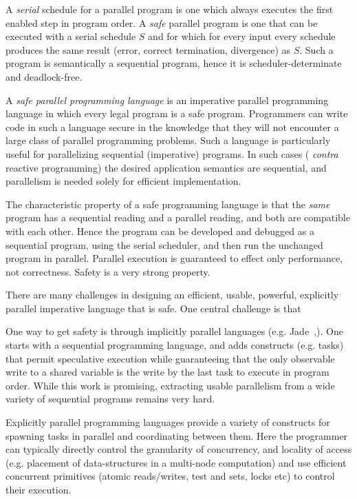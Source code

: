 A {\em serial} schedule for a parallel program is one which always
executes the first enabled step in program order. A {\em safe}
parallel program is one that can be executed with a serial schedule
$S$ and for which for every input every schedule produces the same
result (error, correct termination, divergence) as $S$.  Such a
program is semantically a sequential program, hence it is
scheduler-determinate and deadlock-free.

A {\em safe parallel programming language} is an imperative parallel
programming language in which every legal program is a safe
program. Programmers can write code in such a language secure in the
knowledge that they will not encounter a large class of parallel
programming problems. Such a language is particularly useful for
parallelizing sequential (imperative) programs. In such cases ({\em
  contra} reactive programming) the desired application semantics are
sequential, and parallelism is needed solely for efficient
implementation.

The characteristic property of a safe programming language is that the
{\em same} program has a sequential reading and a parallel reading,
and both are compatible with each other. Hence the program can be
developed and debugged as a sequential program, using the serial
scheduler, and then run the unchanged program in parallel.  Parallel
execution is guaranteed to effect only performance, not
correctness. Safety is a very strong property.

There are many challenges in designing an efficient, usable, powerful,
explicitly parallel imperative language that is safe. One central
challenge is that

One way to get safety is through implicitly parallel languages (e.g.{}
Jade~\cite{Rinard98thedesign},\cite{vonPraun:2007:IPO:1229428.1229443}). One
starts with a sequential programming language, and adds constructs
(e.g.{} tasks) that permit speculative execution while guaranteeing
that the only observable write to a shared variable is the write by
the last task to execute in program order.  While this work is
promising, extracting usable parallelism from a wide variety of
sequential programs remains very hard.

Explicitly parallel programming languages provide a variety of
constructs for spawning tasks in parallel and coordinating between
them. Here the programmer can typically directly control the
granularity of concurrency, and locality of access (e.g. placement of
data-structures in a multi-node computation) and use efficient
concurrent primitives (atomic reads/writes, test and sets, locks etc)
to control their execution.

